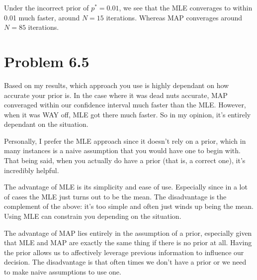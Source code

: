 \documentclass{article}
\begin{document}
Under the incorrect prior of $p^* = 0.01$, we see that the MLE converages to within 0.01 much faster, around $N = 15$ iterations. Whereas MAP converages around $N = 85$ iterations.

\section*{Problem 6.5}
Based on my results, which approach you use is highly dependant on how accurate your prior is. In the case where it was dead nuts accurate, MAP converaged within our confidence interval much faster than the MLE. However, when it was WAY off, MLE got there much faster. So in my opinion, it's entirely dependant on the situation.

Personally, I prefer the MLE approach since it doesn't rely on a prior, which in many instances is a naive assumption that you would have one to begin with. That being said, when you actually do have a prior (that is, a correct one), it's incredibly helpful.

The advantage of MLE is its simplicity and ease of use. Especially since in a lot of cases the MLE just turns out to be the mean. The disadvantage is the complement of the above: it's too simple and often just winds up being the mean. Using MLE can constrain you depending on the situation.

The advantage of MAP lies entirely in the assumption of a prior, especially given that MLE and MAP are exactly the same thing if there is no prior at all. Having the prior allows us to affectively leverage previous information to influence our decision. The disadvantage is that often times we don't have a prior or we need to make naive assumptions to use one.
\end{document}
